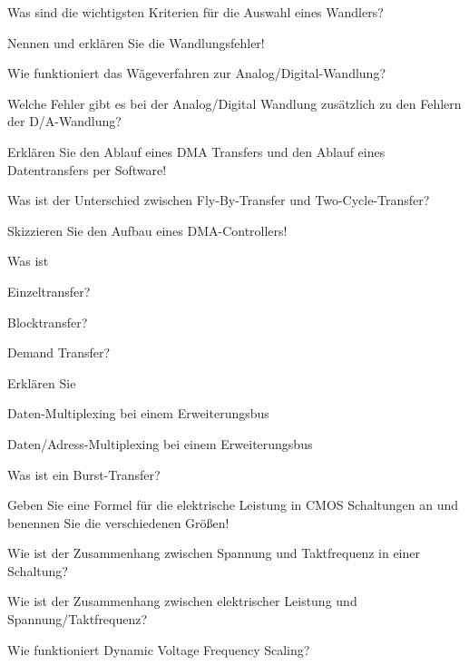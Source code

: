\documentclass
[
  draft    = true,
  fontsize = 11pt,
  parskip  = half-,
  BCOR     = 0pt,
  DIV      = 11,
  ngerman,
  dvipsnames
]
{scrartcl}
\begin{document}
\begin{mytemize}
  \item Was sind die wichtigsten Kriterien für die Auswahl eines Wandlers?
  \item Nennen und erklären Sie die Wandlungsfehler!
  \item Wie funktioniert das Wägeverfahren zur Analog/Digital-Wandlung?
  \item Welche Fehler gibt es bei der Analog/Digital Wandlung zusätzlich zu den Fehlern der D/A-Wandlung?
  \item Erklären Sie den Ablauf eines DMA Transfers und den Ablauf eines Datentransfers per Software!
  \item Was ist der Unterschied zwischen Fly-By-Transfer und Two-Cycle-Transfer?
  \item Skizzieren Sie den Aufbau eines DMA-Controllers!
  \item Was ist
        \begin{mytemize}
          \item Einzeltransfer?
          \item Blocktransfer?
          \item Demand Transfer?
        \end{mytemize}
  \item Erklären Sie
        \begin{mytemize}
          \item Daten-Multiplexing bei einem Erweiterungsbus
          \item Daten/Adress-Multiplexing bei einem Erweiterungsbus
        \end{mytemize}
  \item Was ist ein Burst-Transfer?
  \item Geben Sie eine Formel für die elektrische Leistung in CMOS Schaltungen an und benennen Sie die verschiedenen Größen!
  \item Wie ist der Zusammenhang zwischen Spannung und Taktfrequenz in einer Schaltung?
  \item Wie ist der Zusammenhang zwischen elektrischer Leistung und Spannung/Taktfrequenz?
  \item Wie funktioniert Dynamic Voltage Frequency Scaling?
\end{mytemize}

\end{document}
